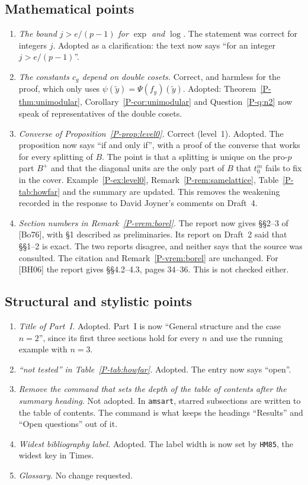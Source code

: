 \documentclass[12pt,letterpaper]{amsart}
\begin{document}
\subsection*{Mathematical points}
\begin{enumerate}[leftmargin=1.5em]
\item \emph{The bound $j>e/(p-1)$ for $\exp$ and $\log$.} The statement
was correct for integers $j$. Adopted as a clarification: the text now
says ``for an integer $j>e/(p-1)$''.
\item \emph{The constants $c_g$ depend on double cosets.} Correct, and
harmless for the proof, which only uses
$\psi(\tilde y)=\Psi(f_y)(\tilde y)$. Adopted: Theorem~\ref{P-thm:unimodular},
Corollary~\ref{P-cor:unimodular} and Question~\ref{P-q:n2} now speak of
representatives of the double cosets.
\item \emph{Converse of Proposition~\ref{P-prop:level0}.} Correct
(level~1). Adopted. The proposition now says ``if and only if'', with a
proof of the converse that works for every splitting of $B$. The point
is that a splitting is unique on the pro-$p$ part $B^+$ and that the
diagonal units are the only part of $B$ that $t_0^m$ fails to fix in
the cover. Example~\ref{P-ex:level0}, Remark~\ref{P-rem:samelattice},
Table~\ref{P-tab:howfar} and the summary are updated. This removes the
weakening recorded in the response to David Joyner's comments on
Draft~4.
\item \emph{Section numbers in Remark~\ref{P-vrem:borel}.} The report
now gives \S\S2--3 of [Bo76], with \S1 described as preliminaries. Its
report on Draft~2 said that \S\S1--2 is exact. The two reports
disagree, and neither says that the source was consulted. The citation
and Remark~\ref{P-vrem:borel} are unchanged. For [BH06] the report
gives \S\S4.2--4.3, pages 34--36. This is not checked either.
\end{enumerate}

\subsection*{Structural and stylistic points}
\begin{enumerate}[leftmargin=1.5em,resume]
\item \emph{Title of Part~I.} Adopted. Part~I is now ``General
structure and the case $n=2$'', since its first three sections hold for
every $n$ and use the running example with $n=3$.
\item \emph{``not tested'' in Table~\ref{P-tab:howfar}.} Adopted. The
entry now says ``open''.
\item \emph{Remove the command that sets the depth of the table of
contents after the summary heading.} Not adopted. In \texttt{amsart}, starred subsections are
written to the table of contents. The command is what keeps the
headings ``Results'' and ``Open questions'' out of it.
\item \emph{Widest bibliography label.} Adopted. The label width is now
set by \texttt{HM85}, the widest key in Times.
\item \emph{Glossary.} No change requested.
\end{enumerate}
\end{document}

